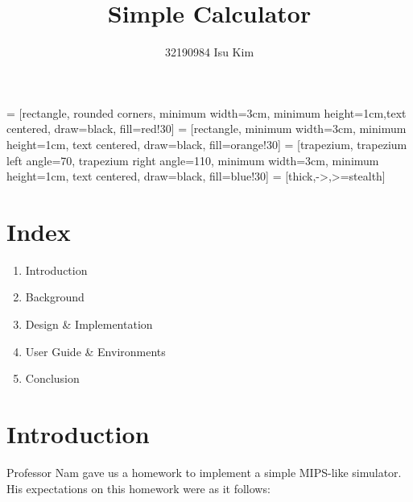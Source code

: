 \documentclass{homework}
\begin{document}
\title{Simple Calculator}
\author{32190984 Isu Kim}
\maketitle

\newenvironment{code}{\captionsetup{type=listing}}{}

 = [rectangle, rounded corners, minimum width=3cm, minimum height=1cm,text centered, draw=black, fill=red!30]
 = [rectangle, minimum width=3cm, minimum height=1cm, text centered, draw=black, fill=orange!30]
 = [trapezium, trapezium left angle=70, trapezium right angle=110, minimum width=3cm, minimum height=1cm, text centered, draw=black, fill=blue!30]
 = [thick,->,>=stealth]

\maketitle
\pagebreak

\section{Index}
\begin{enumerate}
   \item Introduction
   \item Background
   \item Design \& Implementation
   \item User Guide \& Environments
   \item Conclusion
\end{enumerate}
\pagebreak

\section{Introduction}
Professor Nam gave us a homework to implement a simple MIPS-like simulator. His expectations on this homework were as it follows:
\end{document}

